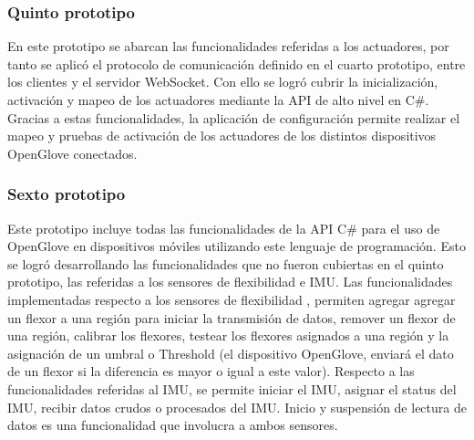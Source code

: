 \subsubsection{Quinto prototipo}
En este prototipo se  abarcan las funcionalidades referidas a los actuadores, por tanto se aplicó el protocolo de comunicación definido en el cuarto prototipo, entre los clientes y el servidor WebSocket. Con ello se logró cubrir la inicialización, activación y mapeo de los actuadores mediante la API de alto nivel en C\#. Gracias a estas funcionalidades, la aplicación de configuración permite realizar el mapeo y pruebas de activación de los actuadores de los distintos dispositivos OpenGlove conectados.

\subsubsection{Sexto prototipo}
Este prototipo incluye todas las funcionalidades de la API C\# para el uso de OpenGlove en dispositivos móviles utilizando este lenguaje de programación. Esto se logró desarrollando las funcionalidades que no fueron cubiertas en el quinto prototipo, las referidas a los sensores de flexibilidad e IMU. Las funcionalidades implementadas respecto a los sensores de flexibilidad , permiten agregar agregar un flexor a una región para iniciar la transmisión de datos, remover un flexor de una región, calibrar los flexores, testear los flexores asignados a una región y la asignación de un umbral o Threshold (el dispositivo OpenGlove, enviará el dato de un flexor si la diferencia es mayor o igual a este valor). Respecto a las funcionalidades referidas al IMU, se permite iniciar el IMU, asignar el status del IMU, recibir datos crudos o procesados del IMU. Inicio y suspensión de lectura de datos es una funcionalidad que involucra a ambos sensores.
